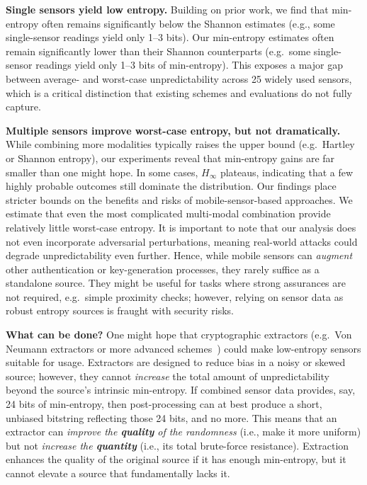 \textbf{Single sensors yield low entropy.} Building on prior work, we find that min-entropy often remains significantly below the Shannon estimates (e.g., some single-sensor readings yield only 1--3 bits). Our min-entropy estimates often remain significantly lower than their Shannon counterparts (e.g.\ some single-sensor readings yield only 1--3 bits of min-entropy).  This exposes a major gap between average- and worst-case unpredictability across 25 widely used sensors, which is a critical distinction that existing schemes and evaluations do not fully capture.
%

\textbf{Multiple sensors improve worst-case entropy, but not dramatically.} While combining more modalities typically raises the upper bound (e.g.\ Hartley or Shannon entropy), our experiments reveal that min-entropy gains are far smaller than one might hope. In some cases, $H_{\infty}$ plateaus, indicating that a few highly probable outcomes still dominate the distribution. Our findings place stricter bounds on the benefits and risks of mobile-sensor-based approaches. We estimate that even the most complicated multi-modal combination provide relatively little worst-case entropy. It is important to note that our analysis does not even incorporate adversarial perturbations, meaning real-world attacks could degrade unpredictability even further. Hence, while mobile sensors can \emph{augment} other authentication or key-generation processes, they rarely suffice as a standalone source. They might be useful for tasks where strong assurances are not required, e.g.\ simple proximity checks; however, relying on sensor data as robust entropy sources is fraught with security risks. 



\textbf{What can be done?} One might hope that cryptographic extractors (e.g.\ Von Neumann extractors or more advanced schemes~\cite{von195113,trevisan2001extractors,barak2003true}) could make low-entropy sensors suitable for usage. Extractors are designed to reduce bias in a noisy or skewed source; however, they cannot \emph{increase} the total amount of unpredictability beyond the source's intrinsic min-entropy. If combined sensor data provides, say, 24 bits of min-entropy, then post-processing can at best produce a short, unbiased bitstring reflecting those 24 bits, and no more. This means that an extractor can \emph{improve the \textbf{quality} of the randomness} (i.e., make it more uniform) but not \emph{increase the \textbf{quantity}} (i.e., its total brute-force resistance). Extraction enhances the quality of the original source if it has enough min-entropy, but it cannot elevate a source that fundamentally lacks it.

